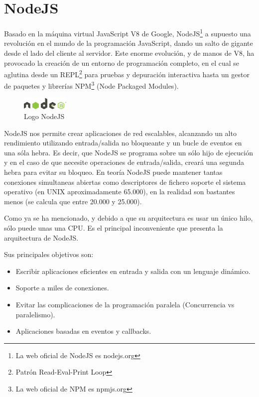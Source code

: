\section{NodeJS}

Basado en la máquina virtual JavaScript V8 de Google, NodeJS\footnote{La web oficial de NodeJS es nodejs.org} a supuesto una revolución en el mundo de la programación JavaScript, dando un salto de gigante desde el lado del cliente al servidor. Este enorme evolución, y de manos de V8, ha provocado la creación de un entorno de programación completo, en el cual se aglutina desde un REPL\footnote{Patrón Read-Eval-Print Loop} para pruebas y depuración interactiva hasta un gestor de paquetes y librerías NPM\footnote{La web oficial de NPM es npmjs.org} (Node Packaged Modules).

\begin{figure}
  \begin{center}
    \includegraphics[width=0.2\textwidth]{imagenes/nodejs-light}
  \end{center}
  \caption{Logo NodeJS}
  \label{fig:nodejs}
\end{figure}

NodeJS nos permite crear aplicaciones de red escalables, alcanzando un alto rendimiento utilizando entrada/salida no bloqueante y un bucle de eventos en una sóla hebra. Es decir, que NodeJS se programa sobre un sólo hijo de ejecución y en el caso de que necesite operaciones de entrada/salida, creará una segunda hebra para evitar su bloqueo. En teoría NodeJS puede mantener tantas conexiones simultaneas abiertas como descriptores de fichero soporte el sistema operativo (en UNIX aproximadamente 65.000), en la realidad son bastantes menos (se calcula que entre 20.000 y 25.000). 

Como ya se ha mencionado, y debido a que su arquitectura es usar un único hilo, sólo puede unas una CPU. Es el principal inconveniente que presenta la arquitectura de NodeJS.

Sus principales objetivos son:
\begin{itemize}
\item Escribir aplicaciones eficientes en entrada y salida con un lenguaje dinámico.
\item Soporte a miles de conexiones.
\item Evitar las complicaciones de la programación paralela (Concurrencia vs paralelismo).
\item Aplicaciones basadas en eventos y callbacks.
\end{itemize}

